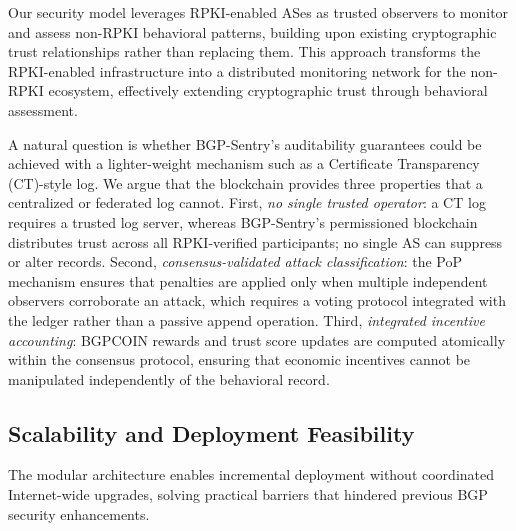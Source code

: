Our security model leverages RPKI-enabled ASes as trusted observers to monitor and assess non-RPKI behavioral patterns, building upon existing cryptographic trust relationships rather than replacing them. This approach transforms the RPKI-enabled infrastructure into a distributed monitoring network for the non-RPKI ecosystem, effectively extending cryptographic trust through behavioral assessment.

A natural question is whether BGP-Sentry's auditability guarantees could be achieved with a lighter-weight mechanism such as a Certificate Transparency (CT)-style log. We argue that the blockchain provides three properties that a centralized or federated log cannot. First, \emph{no single trusted operator}: a CT log requires a trusted log server, whereas BGP-Sentry's permissioned blockchain distributes trust across all RPKI-verified participants; no single AS can suppress or alter records. Second, \emph{consensus-validated attack classification}: the PoP mechanism ensures that penalties are applied only when multiple independent observers corroborate an attack, which requires a voting protocol integrated with the ledger rather than a passive append operation. Third, \emph{integrated incentive accounting}: BGPCOIN rewards and trust score updates are computed atomically within the consensus protocol, ensuring that economic incentives cannot be manipulated independently of the behavioral record.


\subsection{Scalability and Deployment Feasibility}

The modular architecture enables incremental deployment without coordinated Internet-wide upgrades, solving practical barriers that hindered previous BGP security enhancements.

